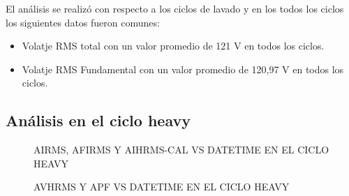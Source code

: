 El análisis se realizó con respecto a los ciclos de lavado y en los todos los ciclos los siguientes datos fueron comunes:

\begin{itemize}
  \itemsep0em
  \item Volatje RMS total con un valor promedio de 121 V en todos los ciclos.
  \item Volatje RMS Fundamental con un valor promedio de 120,97 V en todos los ciclos.
\end{itemize}

\subsection{Análisis en el ciclo heavy}
\begin{figure}[H]
  \hfill
  \hfill
  \hfill
  \caption{AIRMS, AFIRMS Y AIHRMS-CAL VS DATETIME EN EL CICLO HEAVY}
  \end{figure}
\begin{figure}[H]
  \hfill
  \hfill
  \hfill
  \caption{AVHRMS Y APF VS DATETIME EN EL CICLO HEAVY}
  \end{figure}
